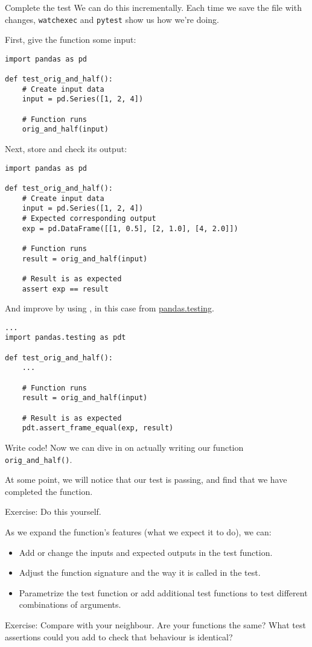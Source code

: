 \documentclass[12pt,aspectratio=169]{beamer}
\begin{document}
\begin{frame}{Complete the test}
We can do this incrementally.
Each time we save the file with changes, \verb|watchexec| and \verb|pytest| show us how we're doing.

\medskip
First, give the function some input:
\begin{verbatim}
import pandas as pd

def test_orig_and_half():
    # Create input data
    input = pd.Series([1, 2, 4])

    # Function runs
    orig_and_half(input)
\end{verbatim}

\framebreak
Next, store and check its output:
\begin{verbatim}
import pandas as pd

def test_orig_and_half():
    # Create input data
    input = pd.Series([1, 2, 4])
    # Expected corresponding output
    exp = pd.DataFrame([[1, 0.5], [2, 1.0], [4, 2.0]])

    # Function runs
    result = orig_and_half(input)

    # Result is as expected
    assert exp == result
\end{verbatim}

\framebreak
And improve by using , in this case from \href{https://pandas.pydata.org/pandas-docs/stable/reference/api/pandas.testing.assert_frame_equal.html}{pandas.testing}.

\begin{verbatim}
...
import pandas.testing as pdt

def test_orig_and_half():
    ...

    # Function runs
    result = orig_and_half(input)

    # Result is as expected
    pdt.assert_frame_equal(exp, result)
\end{verbatim}
\end{frame}

\begin{frame}{Write code!}
Now we can dive in on actually writing our function \texttt{orig_and_half()}.

\medskip
At some point, we will notice that our test is passing, and find that we have completed the function.

\smallskip
Exercise: Do this yourself.

\medskip
As we expand the function's features (what we expect it to do), we can:
\begin{itemize}
  \item Add or change the inputs and expected outputs in the test function.
  \item Adjust the function signature and the way it is called in the test.
  \item Parametrize the test function or add additional test functions to test different combinations of arguments.
\end{itemize}
\pause\smallskip
Exercise: Compare with your neighbour. Are your functions the same? What test assertions could you add to check that behaviour is identical?
\end{frame}
\end{document}
